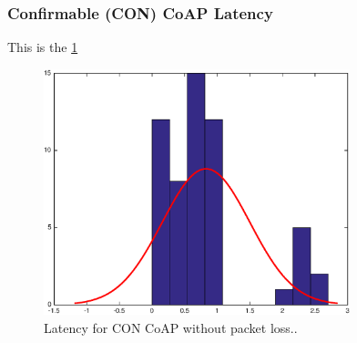 \subsubsection{Confirmable (CON) CoAP Latency}
This is the \figurename \ref{fig_sim2}
\begin{figure}[bht]
	\centering
	\includegraphics[width=3.5in]{gfx/coapoverudp}
	\caption{Latency for CON CoAP without packet loss..}
	\label{fig_sim2}
\end{figure}



